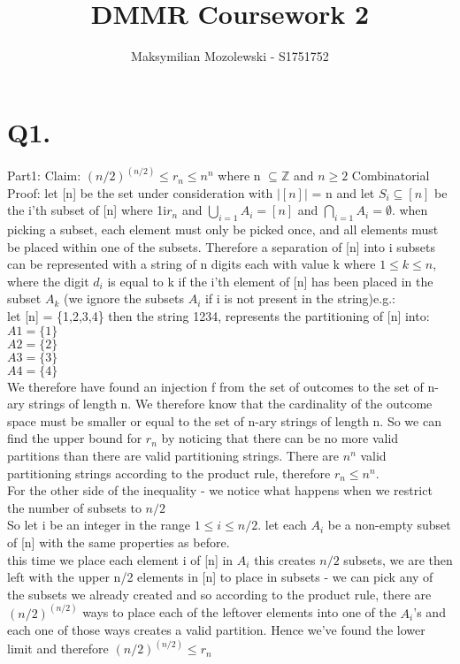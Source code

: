 \documentclass{report}
\begin{document}
\title{DMMR Coursework 2}
\author{Maksymilian Mozolewski - S1751752}
\maketitle

\section*{Q1.}
Part1: \newline
Claim: $(n/2)^{(n/2)} \leq r_{n} \leq n^n$ where n $\subseteq \mathbb{Z}$ and $n \geq 2$ \newline
Combinatorial Proof: let [n] be the set under consideration with $|[n]|$ = n and let $S_{i} \subseteq [n]$ be the i'th subset of [n] where 1\leq i\leq $r_{n}$ and $\bigcup\limits_{i = 1} A_{i} = [n] $ and $\bigcap\limits_{i=1} A_{i} = \emptyset$. \newline
when picking a subset, each element must only be picked once, and all elements must be placed within one of the subsets. Therefore a separation of [n] into i subsets can be represented with a string of n digits each with value k where $1\leq k\leq n$, where the digit $d_{i}$ is equal to k if the i'th element of [n] has been placed in the subset $A_{k}$ (we ignore the subsets $A_{i}$ if i is not present in the string)e.g.: \\ \break
let [n] = \{1,2,3,4\} then the string 1234, represents the partitioning of [n] into:\newline
$A1 = \{1\}$ \\
$A2 = \{2\}$ \\ 
$A3 = \{3\}$ \\
$A4 = \{4\}$ \\ \break
We therefore have found an injection f from the set of outcomes to the set of n-ary strings of length n. We therefore know that the cardinality of the outcome space must be smaller or equal to the set of n-ary strings of length n. So we can find the upper bound for $r_{n}$ by noticing that there can be no more valid partitions than there are valid partitioning strings. There are $n^n$ valid partitioning strings according to the product rule, therefore $r_{n} \leq n^n$. \\ \break
For the other side of the inequality - we notice what happens when we restrict the number of subsets to $n/2$ \\ \break
So let i be an integer in the range $1\leq i\leq n/2$.
let each $A_{i}$ be a non-empty subset of [n] with the same properties as before. \\ \break
this time
we place each element i of [n] in $A_{i}$
this creates $n/2$ subsets, we are then left with the upper n/2 elements in [n] to place in subsets - we can pick any of the subsets we already created and so according to the product rule, there are $(n/2) ^{(n/2)}$ ways to place each of the leftover elements into one of the $A_{i}$'s and each one of those ways creates a valid partition. Hence we've found the lower limit and therefore $(n/2) ^{(n/2)} \leq r_{n}$   
\end{document}
